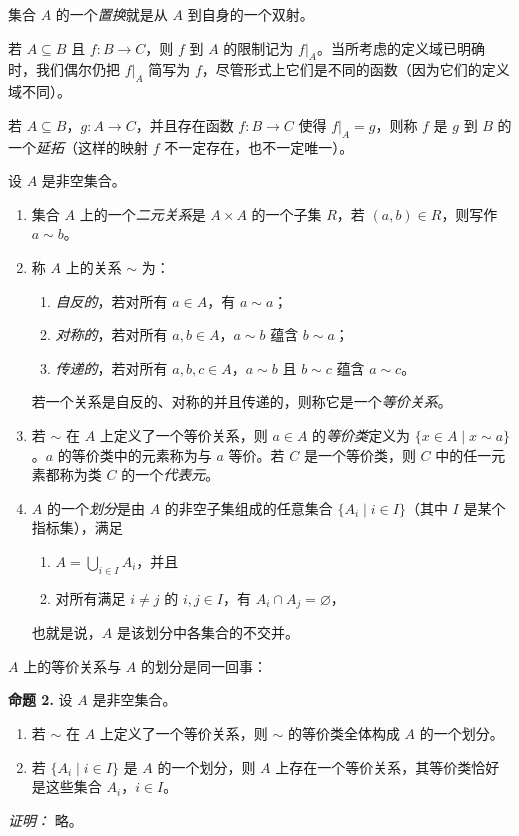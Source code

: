 集合 $A$ 的一个\emph{置换}就是从 $A$ 到自身的一个双射。

若 $A\subseteq B$ 且 $f:B\to C$，则 $f$ 到 $A$ 的限制记为 $f|_A$。当所考虑的定义域已明确时，我们偶尔仍把 $f|_A$ 简写为 $f$，尽管形式上它们是不同的函数（因为它们的定义域不同）。

若 $A\subseteq B$，$g:A\to C$，并且存在函数 $f:B\to C$ 使得 $f|_A=g$，则称 $f$ 是 $g$ 到 $B$ 的一个\emph{延拓}（这样的映射 $f$ 不一定存在，也不一定唯一）。

设 $A$ 是非空集合。
\begin{enumerate}[label=(\arabic*)]
  \item 集合 $A$ 上的一个\emph{二元关系}是 $A\times A$ 的一个子集 $R$，若 $(a,b)\in R$，则写作 $a\sim b$。
  \item 称 $A$ 上的关系 $\sim$ 为：
  \begin{enumerate}[label=(\alph*)]
    \item \emph{自反的}，若对所有 $a\in A$，有 $a\sim a$；
    \item \emph{对称的}，若对所有 $a,b\in A$，$a\sim b$ 蕴含 $b\sim a$；
    \item \emph{传递的}，若对所有 $a,b,c\in A$，$a\sim b$ 且 $b\sim c$ 蕴含 $a\sim c$。
  \end{enumerate}
  若一个关系是自反的、对称的并且传递的，则称它是一个\emph{等价关系}。
  \item 若 $\sim$ 在 $A$ 上定义了一个等价关系，则 $a\in A$ 的\emph{等价类}定义为 $\{x\in A\mid x\sim a\}$。$a$ 的等价类中的元素称为与 $a$ 等价。若 $C$ 是一个等价类，则 $C$ 中的任一元素都称为类 $C$ 的一个\emph{代表元}。
  \item $A$ 的一个\emph{划分}是由 $A$ 的非空子集组成的任意集合 $\{A_i\mid i\in I\}$（其中 $I$ 是某个指标集），满足
  \begin{enumerate}[label=(\alph*)]
    \item $A=\bigcup_{i\in I}A_i$，并且
    \item 对所有满足 $i\neq j$ 的 $i,j\in I$，有 $A_i\cap A_j=\varnothing$，
  \end{enumerate}
  也就是说，$A$ 是该划分中各集合的不交并。
\end{enumerate}

$A$ 上的等价关系与 $A$ 的划分是同一回事：

\medskip
\noindent\textbf{命题 2.} 设 $A$ 是非空集合。
\begin{enumerate}[label=(\arabic*)]
  \item 若 $\sim$ 在 $A$ 上定义了一个等价关系，则 $\sim$ 的等价类全体构成 $A$ 的一个划分。
  \item 若 $\{A_i\mid i\in I\}$ 是 $A$ 的一个划分，则 $A$ 上存在一个等价关系，其等价类恰好是这些集合 $A_i$，$i\in I$。
\end{enumerate}
\noindent\textit{证明：} 略。

